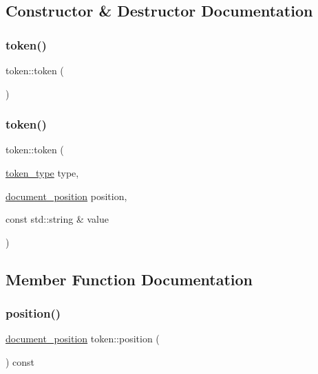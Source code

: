 \subsection{Constructor \& Destructor Documentation}
\mbox{\label{classtoken_a91d47c8b276e40caa47e2fe678135417}} 
\subsubsection{\texorpdfstring{token()}{token()}\hspace{0.1cm}{\footnotesize\ttfamily [1/2]}}
{\footnotesize\ttfamily token\+::token (\begin{DoxyParamCaption}{ }\end{DoxyParamCaption})\hspace{0.3cm}{\ttfamily [inline]}}

\mbox{\label{classtoken_ac6db120070abce4758114c5882ef0006}} 
\subsubsection{\texorpdfstring{token()}{token()}\hspace{0.1cm}{\footnotesize\ttfamily [2/2]}}
{\footnotesize\ttfamily token\+::token (\begin{DoxyParamCaption}\item[{\mbox{\hyperlink{token_8h_afe5ef662303b6b710ea6ee1a944bad0d}{token\+\_\+type}}}]{type,  }\item[{\mbox{\hyperlink{structdocument__position}{document\+\_\+position}}}]{position,  }\item[{const std\+::string \&}]{value }\end{DoxyParamCaption})\hspace{0.3cm}{\ttfamily [inline]}}



\subsection{Member Function Documentation}
\mbox{\label{classtoken_a5d51a27a6e2c80da1d237bb2a2ce5f94}} 
\subsubsection{\texorpdfstring{position()}{position()}}
{\footnotesize\ttfamily \mbox{\hyperlink{structdocument__position}{document\+\_\+position}} token\+::position (\begin{DoxyParamCaption}{ }\end{DoxyParamCaption}) const\hspace{0.3cm}{\ttfamily [inline]}}

